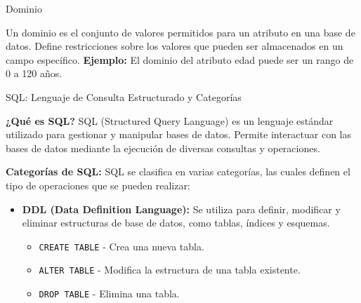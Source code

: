 \documentclass[spanish]{beamer}
\begin{document}
\begin{frame}{Dominio}
    \begin{tcolorbox}[title=Dominio,colback=gray!5!white,colframe=gray!75!black]
        Un dominio es el conjunto de valores permitidos para un atributo en una base de datos. 
        Define restricciones sobre los valores que pueden ser almacenados en un campo específico.
        \textbf{Ejemplo:} El dominio del atributo edad puede ser un rango de 0 a 120 años.
    \end{tcolorbox}
\end{frame}


\begin{frame}{SQL: Lenguaje de Consulta Estructurado y Categorías}
    \begin{tcolorbox}[title=SQL,colback=orange!5!white,colframe=orange!75!black]
        
        \textbf{¿Qué es SQL?}  
        SQL (Structured Query Language) es un lenguaje estándar utilizado para gestionar y manipular bases de datos.  
        Permite interactuar con las bases de datos mediante la ejecución de diversas consultas y operaciones.

        \textbf{Categorías de SQL:}  
        SQL se clasifica en varias categorías, las cuales definen el tipo de operaciones que se pueden realizar:

        \begin{itemize}
            \item \textbf{DDL (Data Definition Language):}  
                Se utiliza para definir, modificar y eliminar estructuras de base de datos, como tablas, índices y esquemas.  
                \begin{itemize}
                    \item \texttt{CREATE TABLE} - Crea una nueva tabla.
                    \item \texttt{ALTER TABLE} - Modifica la estructura de una tabla existente.
                    \item \texttt{DROP TABLE} - Elimina una tabla.
                \end{itemize}


        \end{itemize}
    \end{tcolorbox}
\end{frame}
\end{document}
